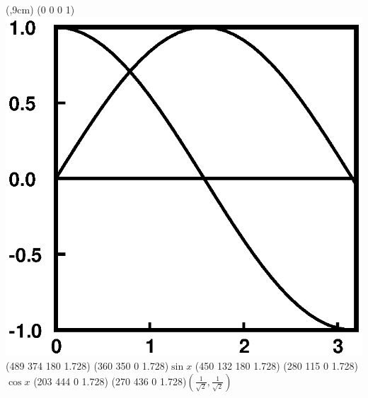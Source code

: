 \documentclass{seminar}
\begin{document}
\begin{iteblock}(\textwidth,9cm)
\ITE(0 0 0 1)\includegraphics{sc.eps}
\ITE(489 374 180 1.728)
\ITE(360 350 0 1.728)$\sin x$
\ITE(450 132 180 1.728)
\ITE(280 115 0 1.728)$\cos x$
\ITE(203 444 0 1.728)
\ITE(270 436 0 1.728)$(\frac1{\sqrt2},\frac1{\sqrt2})$

\end{iteblock}
\end{document}
